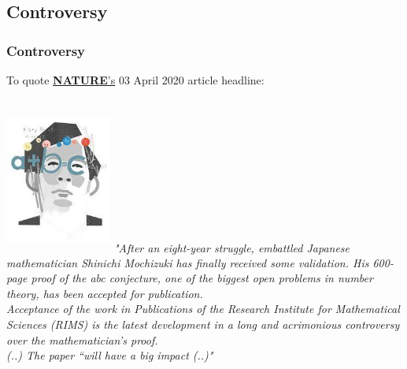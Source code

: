 \documentclass[9pt]{beamer}
\begin{document}
        \subsection{Controversy}
        \begin{frame}
            \frametitle{Controversy}
                To quote \href{https://www.nature.com/articles/d41586-020-00998-2}{\textbf{\color{blue}NATURE}'s} 03 April 2020 article headline: \\
            \begin{columns}
                    \vspace{0.5cm}
                    \includegraphics[width=3.5cm, height=4.75cm]{images/init.jpeg}
                    \justify
                    \textit{"After an eight-year struggle, embattled Japanese mathematician Shinichi Mochizuki has finally received some validation. His 600-page proof of the abc conjecture, one of the biggest open problems in number theory, has been accepted for publication.\\\vspace{0.35cm}
                    Acceptance of the work in Publications of the Research Institute for Mathematical Sciences (RIMS) is the latest development in a long and acrimonious controversy over the mathematician’s proof.\\\vspace{0.35cm}
                    (..) The paper “will have a big impact (..)"}
            \end{columns}
        \end{frame}
        
\end{document}
